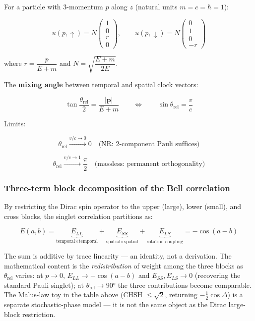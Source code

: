 \documentclass[
]{article}
\begin{document}
For a particle with 3-momentum \(p\) along \(z\) (natural units
\(m = c = \hbar = 1\)):

\[u(p, \uparrow) = N \begin{pmatrix} 1 \\ 0 \\ r \\ 0 \end{pmatrix}, \qquad u(p, \downarrow) = N \begin{pmatrix} 0 \\ 1 \\ 0 \\ -r \end{pmatrix}\]

where \(r = \dfrac{p}{E + m}\) and \(N = \sqrt{\dfrac{E+m}{2E}}\).

The \textbf{mixing angle} between temporal and spatial clock vectors:

\[\tan\frac{\theta_{\text{rel}}}{2} = \frac{|\mathbf{p}|}{E + m} \qquad \Longleftrightarrow \qquad \sin\theta_{\text{rel}} = \frac{v}{c}\]

Limits:

\[\theta_{\text{rel}} \xrightarrow{v/c \to 0} 0 \quad \text{(NR: 2-component Pauli suffices)}\]

\[\theta_{\text{rel}} \xrightarrow{v/c \to 1} \frac{\pi}{2} \quad \text{(massless: permanent orthogonality)}\]

\subsubsection{Three-term block decomposition of the Bell
correlation}\label{three-term-block-decomposition-of-the-bell-correlation}

By restricting the Dirac spin operator to the upper (large), lower
(small), and cross blocks, the singlet correlation partitions as:

\[E(a, b) = \underbrace{E_{LL}}_{\text{temporal} \times \text{temporal}} + \underbrace{E_{SS}}_{\text{spatial} \times \text{spatial}} + \underbrace{E_{LS}}_{\text{rotation coupling}} = -\cos(a - b)\]

The sum is additive by trace linearity --- an identity, not a
derivation. The mathematical content is the \emph{redistribution} of
weight among the three blocks as \(\theta_{\text{rel}}\) varies: at
\(p \to 0\), \(E_{LL} \to -\cos(a-b)\) and \(E_{SS}, E_{LS} \to 0\)
(recovering the standard Pauli singlet); at
\(\theta_{\text{rel}} \to 90°\) the three contributions become
comparable. The Malus-law toy in the table above (CHSH
\(\leq \sqrt{2}\), returning \(-\tfrac{1}{2}\cos\Delta\)) is a separate
stochastic-phase model --- it is not the same object as the Dirac
large-block restriction.
\end{document}
